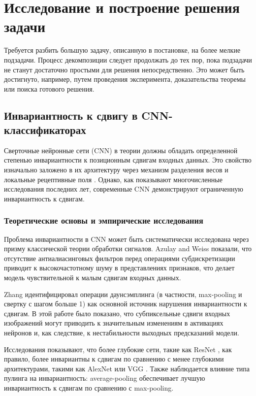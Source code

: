 \section{Исследование и построение решения задачи}
\label{sec:Chapter3} 

Требуется разбить большую задачу, описанную в постановке, на более мелкие
подзадачи. Процесс декомпозиции следует продолжать до тех пор, пока подзадачи
не станут достаточно простыми для решения непосредственно. Это может быть
достигнуто, например, путем проведения эксперимента, доказательства теоремы
или поиска готового решения.

\subsection{Инвариантность к сдвигу в CNN-классификаторах}
\label{sec:invariance}

Сверточные нейронные сети (CNN) в теории должны обладать определенной степенью инвариантности к позиционным сдвигам входных данных. Это свойство изначально заложено в их архитектуру через механизм разделения весов и локальные рецептивные поля \cite{LeCun1998}. Однако, как показывают многочисленные исследования последних лет, современные CNN демонстрируют ограниченную инвариантность к сдвигам.

\subsubsection{Теоретические основы и эмпирические исследования}
\label{sec:invariance:theory}

Проблема инвариантности в CNN может быть систематически исследована через призму классической теории обработки сигналов. Azulay and Weiss \cite{Azulay2018} показали, что отсутствие антиалиасинговых фильтров перед операциями субдискретизации приводит к высокочастотному шуму в представлениях признаков, что делает модель чувствительной к малым сдвигам входных данных.

Zhang \cite{Zhang2019} идентифицировал операции даунсэмплинга (в частности, max-pooling и свертку с шагом больше 1) как основной источник нарушения инвариантности к сдвигам. В этой работе было показано, что субпиксельные сдвиги входных изображений могут приводить к значительным изменениям в активациях нейронов и, как следствие, к нестабильности выходных предсказаний модели.

Исследования показывают, что более глубокие сети, такие как ResNet \cite{He2016}, как правило, более инвариантны к сдвигам по сравнению с менее глубокими архитектурами, такими как AlexNet или VGG \cite{Simonyan2014}. Также наблюдается влияние типа пулинга на инвариантность: average-pooling обеспечивает лучшую инвариантность к сдвигам по сравнению с max-pooling.

